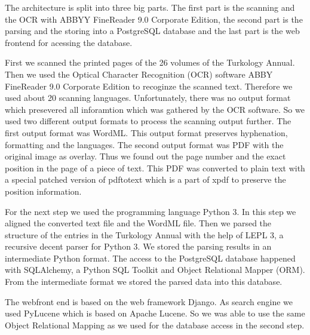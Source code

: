 The architecture is split into three big parts. The first part is the scanning and the OCR with ABBYY FineReader 9.0 Corporate Edition, the second part is the parsing and the storing into a PostgreSQL database and the last part is the web frontend for acessing the database.

First we scanned the printed pages of the 26 volumes of the Turkology Annual. Then we used the Optical Character Recognition (OCR) software ABBY FineReader 9.0 Corporate Edition to recoginze the scanned text. Therefore we used about 20 scanning languages. Unfortunately, there was no output format which presevered all inforamtion which was gathered by the OCR software. So we used two different output formats to process the scanning output further. The first output format was WordML. This output format preserves hyphenation, formatting and the languages. The second output format was PDF with the original image as overlay. Thus we found out the page number and the exact position in the page of a piece of text. This PDF was converted to plain text with a special patched version of pdftotext which is a part of xpdf to preserve the position information.

For the next step we used the programming language Python 3. In this step we aligned the converted text file and the WordML file. Then we parsed the structure of the entries in the Turkology Annual with the help of LEPL 3, a recursive decent parser for Python 3. We stored the parsing results in an intermediate Python format. The access to the PostgreSQL database happened with SQLAlchemy, a Python SQL Toolkit and Object Relational Mapper (ORM). From the intermediate format we stored the parsed data into this database.

The webfront end is based on the web framework Django. As search engine we used PyLucene which is based on Apache Lucene. So we was able to use the same Object Relational Mapping as we used for the database access in the second step.
